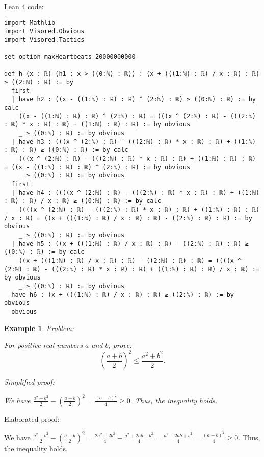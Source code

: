 \documentclass{article}
\newtheorem{example}{Example}
\begin{document}
Lean 4 code:
\begin{tcolorbox}[colback=white!10, width=\linewidth]
\begin{lstlisting}[language=Lean4]
import Mathlib
import Visored.Obvious
import Visored.Tactics

set_option maxHeartbeats 20000000000

def h (x : ℝ) (h1 : x > ((0:ℕ) : ℝ)) : (x + (((1:ℕ) : ℝ) / x : ℝ) : ℝ) ≥ ((2:ℕ) : ℝ) := by
  first
  | have h2 : ((x - ((1:ℕ) : ℝ) : ℝ) ^ (2:ℕ) : ℝ) ≥ ((0:ℕ) : ℝ) := by calc
    ((x - ((1:ℕ) : ℝ) : ℝ) ^ (2:ℕ) : ℝ) = (((x ^ (2:ℕ) : ℝ) - (((2:ℕ) : ℝ) * x : ℝ) : ℝ) + ((1:ℕ) : ℝ) : ℝ) := by obvious
    _ ≥ ((0:ℕ) : ℝ) := by obvious
  | have h3 : (((x ^ (2:ℕ) : ℝ) - (((2:ℕ) : ℝ) * x : ℝ) : ℝ) + ((1:ℕ) : ℝ) : ℝ) ≥ ((0:ℕ) : ℝ) := by calc
    (((x ^ (2:ℕ) : ℝ) - (((2:ℕ) : ℝ) * x : ℝ) : ℝ) + ((1:ℕ) : ℝ) : ℝ) = ((x - ((1:ℕ) : ℝ) : ℝ) ^ (2:ℕ) : ℝ) := by obvious
    _ ≥ ((0:ℕ) : ℝ) := by obvious
  first
  | have h4 : ((((x ^ (2:ℕ) : ℝ) - (((2:ℕ) : ℝ) * x : ℝ) : ℝ) + ((1:ℕ) : ℝ) : ℝ) / x : ℝ) ≥ ((0:ℕ) : ℝ) := by calc
    ((((x ^ (2:ℕ) : ℝ) - (((2:ℕ) : ℝ) * x : ℝ) : ℝ) + ((1:ℕ) : ℝ) : ℝ) / x : ℝ) = ((x + (((1:ℕ) : ℝ) / x : ℝ) : ℝ) - ((2:ℕ) : ℝ) : ℝ) := by obvious
    _ ≥ ((0:ℕ) : ℝ) := by obvious
  | have h5 : ((x + (((1:ℕ) : ℝ) / x : ℝ) : ℝ) - ((2:ℕ) : ℝ) : ℝ) ≥ ((0:ℕ) : ℝ) := by calc
    ((x + (((1:ℕ) : ℝ) / x : ℝ) : ℝ) - ((2:ℕ) : ℝ) : ℝ) = ((((x ^ (2:ℕ) : ℝ) - (((2:ℕ) : ℝ) * x : ℝ) : ℝ) + ((1:ℕ) : ℝ) : ℝ) / x : ℝ) := by obvious
    _ ≥ ((0:ℕ) : ℝ) := by obvious
  have h6 : (x + (((1:ℕ) : ℝ) / x : ℝ) : ℝ) ≥ ((2:ℕ) : ℝ) := by obvious
  obvious

\end{lstlisting}
\end{tcolorbox}


\begin{example}
Problem:
\begin{tcolorbox}[colback=yellow!10, width=\linewidth]
For positive real numbers $a$ and $b$, prove:
    $$\left(\frac{a+b}{2}\right)^2 \leq \frac{a^2+b^2}{2}.$$
\end{tcolorbox}

Simplified proof:
\begin{tcolorbox}[colback=blue!10, width=\linewidth]
We have
$ \frac{a^2+b^2}{2} - \left(\frac{a+b}{2}\right)^2 = \frac{(a-b)^2}{4} \ge 0. $
Thus, the inequality holds.
\end{tcolorbox}
\end{example}

Elaborated proof:
\begin{tcolorbox}[colback=green!10, width=\linewidth]
We have
$ \frac{a^2+b^2}{2} - \left(\frac{a+b}{2}\right)^2 = \frac{2a^2+2b^2}{4} - \frac{a^2+2ab+b^2}{4} = \frac{a^2-2ab+b^2}{4} = \frac{(a-b)^2}{4} \ge 0. $
Thus, the inequality holds.
\end{tcolorbox}
\end{document}
